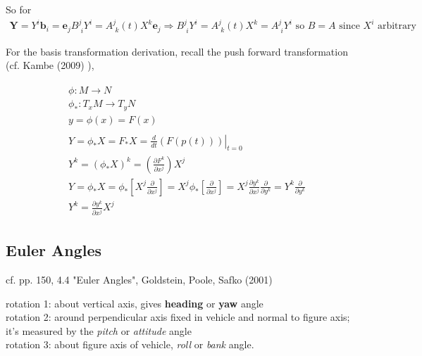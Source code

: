 So for 
\begin{equation}\label{dgdt:Eq:ActiveAndPassiveRotationsEqual}
\begin{gathered}
\mathbf{Y} = Y^i \mathbf{b}_i = \mathbf{e}_j B^j_{\, \, i} Y^i = A^j_{\, \, k}(t) X^k \mathbf{e}_j \Longrightarrow B^j_{\, \, i} Y^i = A^j_{\, \, k}(t) X^k = A^j_{\, \, i} Y^i \text{ so } \boxed{ B = A } \text{ since $X^i$ arbitrary }
\end{gathered}
\end{equation}

For the basis transformation derivation, recall the push forward transformation (cf. Kambe (2009) \cite{dgdt:TKambe2009}),

\[
\begin{gathered}
	\begin{aligned}
	& \phi : M \to N \\
	& \phi_* : T_xM \to T_y N \\
	& y = \phi(x) = F(x)
	\end{aligned} \\
\begin{aligned} 
& Y = \phi_* X = F_* X = \left. \frac{d}{dt} (F(p(t))) \right|_{t=0} \\
& Y^k = (\phi_* X)^k = \left( \frac{ \partial F^k }{ \partial x^j } \right) X^j \\
& Y = \phi_* X = \phi_* \left[ X^j \frac{ \partial }{ \partial x^j } \right] = X^j \phi_* \left[ \frac{ \partial }{ \partial x^j } \right] = X^j \frac{ \partial y^k}{ \partial x^j} \frac{ \partial }{ \partial y^k } = Y^k \frac{ \partial }{ \partial y^k } \\
& Y^k  = \frac{ \partial y^k }{ \partial x^j } X^j
\end{aligned} 
\end{gathered}
\]

\subsection{Euler Angles}

cf. pp. 150, 4.4 "Euler Angles", Goldstein, Poole, Safko (2001) \cite{dgdt:GPS2001}

rotation 1: about vertical axis, gives \textbf{heading} or \textbf{yaw} angle \\
rotation 2: around perpendicular axis fixed in vehicle and normal to figure axis; it's measured by the \emph{pitch} or \emph{attitude} angle \\
rotation 3: about figure axis of vehicle, \emph{roll} or \emph{bank} angle.


